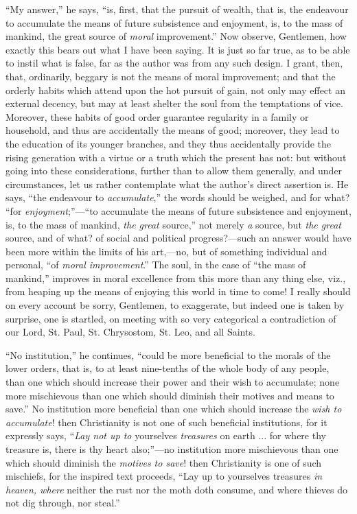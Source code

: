 ``My answer,'' he says, ``is, first, that the pursuit
of wealth, that is, the endeavour to accumulate the means of future
subsistence and enjoyment, is, to the mass of mankind, the great
source of \emph{moral} improvement.'' Now observe, Gentlemen, how
exactly this bears out what I have been saying. It is just so far
true, as to be able to instil what is false, far as the author was
from any such design. I grant, then, that, ordinarily, beggary is not
the means of moral improvement; and that the orderly habits which
attend upon the hot pursuit of gain, not only may effect an external
decency, but may at least shelter the soul from the temptations of
vice. Moreover, these habits of good order guarantee regularity in a
family or household, and thus are accidentally the means of good;
moreover, they lead to the education of its younger branches, and
they thus accidentally provide the rising generation with a virtue or
a truth which the present has not: but without going into these
considerations, further than to allow them generally, and under
circumstances, let us rather contemplate what the author's direct
assertion is. He says, ``the endeavour to \emph{accumulate},''
the words should be weighed, and for what? ``for \emph{enjoyment};''—``to
accumulate the means of future subsistence and enjoyment, is, to the
mass of mankind, \emph{the great} source,'' not merely \emph{a}
source, but \emph{the great} source, and of what? of social and
political progress?—such an answer would have been more within the
limits of his art,—no, but of something individual and personal,
``of \emph{moral improvement}.'' The soul, in the case of
``the mass of mankind,'' improves in moral excellence from
this more than any thing else, viz., from heaping up the means of
enjoying this world in time to come! I really should on every account
be sorry, Gentlemen, to exaggerate, but indeed one is taken by
surprise, one is startled, on meeting with so very categorical a
contradiction of our Lord, St. Paul, St. Chrysostom, St. Leo, and all
Saints.

``No institution,'' he continues, ``could be more
beneficial to the morals of the lower orders, that is, to at least
nine-tenths of the whole body of any people, than one which should
increase their power and their wish to accumulate; none more
mischievous than one which should diminish their motives and means to
save.'' No institution more beneficial than one which should
increase the \emph{wish to accumulate}! then Christianity is not one
of such beneficial institutions, for it expressly says, ``\emph{Lay
not up to} yourselves \emph{treasures} on earth ... for where thy
treasure is, there is thy heart also;''—no institution more
mischievous than one which should diminish the \emph{motives to save}!
then Christianity is one of such mischiefs, for the inspired text
proceeds, ``Lay up to yourselves treasures \emph{in heaven, where}
neither the rust nor the moth doth consume, and where thieves do not
dig through, nor steal.''

